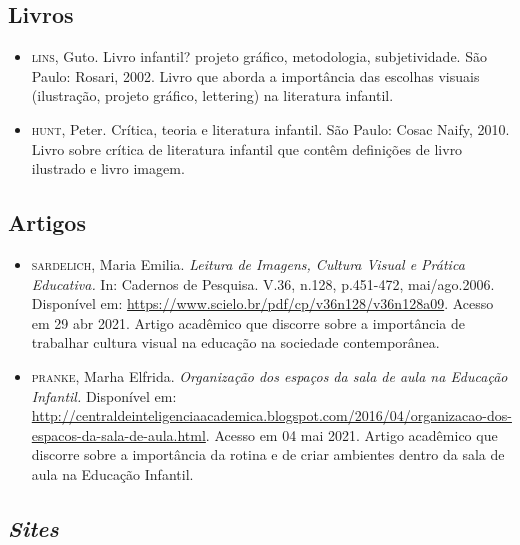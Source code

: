 \documentclass[11pt]{extarticle}
\begin{document}
\subsection{Livros} 

\begin{itemize}
\item \textsc{lins}, Guto. Livro infantil? projeto gráfico, metodologia, subjetividade. São Paulo: Rosari, 2002.
Livro que aborda a importância das escolhas visuais (ilustração, projeto gráfico, lettering) na literatura infantil.  

\item \textsc{hunt}, Peter. Crítica, teoria e literatura infantil. São Paulo: Cosac Naify, 2010.
Livro sobre crítica de literatura infantil que contêm definições de livro ilustrado e livro imagem. 
\end{itemize}

\subsection{Artigos}

\begin{itemize}

\item \textsc{sardelich}, Maria Emilia. \emph{Leitura de Imagens, Cultura Visual e Prática Educativa.} 
In: Cadernos de Pesquisa. V.36, n.128, p.451-472, mai/ago.2006. Disponível em: \url{https://www.scielo.br/pdf/cp/v36n128/v36n128a09}. 
Acesso em 29 abr 2021. 
Artigo acadêmico que discorre sobre a importância de trabalhar cultura 
visual na educação na sociedade contemporânea. 

\item \textsc{pranke}, Marha Elfrida. \emph{Organização dos espaços da sala de aula na Educação Infantil.} Disponível em: 
\url{http://centraldeinteligenciaacademica.blogspot.com/2016/04/organizacao-dos-espacos-da-sala-de-aula.html}. Acesso em 04 mai 2021. 
Artigo acadêmico que discorre sobre a importância da rotina e de criar ambientes dentro da sala de aula na Educação Infantil.  
\end{itemize}

\subsection{\textit{Sites}}
\end{document}
